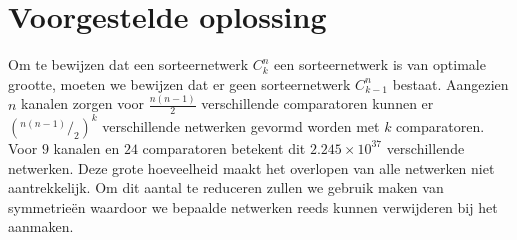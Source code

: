 \documentclass{article}
\begin{document}
\newcommand*\rfrac[2]{{}^{#1}\!/_{#2}}
\section{Voorgestelde oplossing}\label{VoorgesteldeOplossing}
Om te bewijzen dat een sorteernetwerk $C^n_k$ een sorteernetwerk is van optimale grootte, moeten we bewijzen dat er geen sorteernetwerk $C^n_{k-1}$ bestaat.
Aangezien $n$ kanalen zorgen voor $\frac{n \left(n-1\right)}{2}$ verschillende comparatoren kunnen er $\left(\rfrac{n \left(n-1\right)}{2}\right) ^k$ verschillende netwerken gevormd worden met  $k$ comparatoren.
Voor $9$ kanalen en $24$ comparatoren betekent dit $2.245 \times 10^{37}$ verschillende netwerken.
Deze grote hoeveelheid maakt het overlopen van alle netwerken niet aantrekkelijk.
Om dit aantal te reduceren zullen we gebruik maken van symmetrie\"en waardoor we bepaalde netwerken reeds kunnen verwijderen bij het aanmaken.
\end{document}
